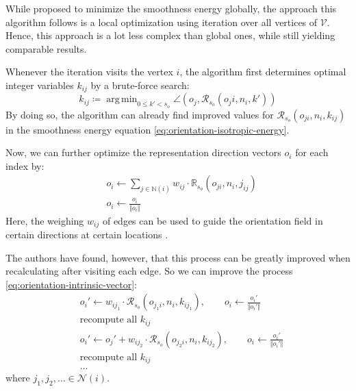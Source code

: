 \documentclass{ACGSeminar}
\DeclareMathOperator*{\argmin}{arg\,min}
\begin{document}
While \cite{bommes2009mixed} proposed to minimize the smoothness energy globally, the approach this algorithm follows is a local optimization using iteration over all vertices of $\mathcal{V}$. Hence, this approach is a lot less complex than global ones, while still yielding comparable results.

Whenever the iteration visits the vertex $i$, the algorithm first determines optimal integer variables $k_{ij}$ by a brute-force search:
\begin{equation}\label{eq:orientation-intrinsic-integer}
	k_{ij} \coloneqq \argmin_{0 \leq k' < s_o} \angle(o_j, \mathcal{R}_{s_o}(o_ji, n_i, k'))
\end{equation}
By doing so, the algorithm can already find improved values for $\mathcal{R}_{s_o}(o_{ji}, n_i, k_{ij})$ in the smoothness energy equation \eqref{eq:orientation-isotropic-energy}.

Now, we can further optimize the representation direction vectors $o_i$ for each index by:
\begin{equation}\label{eq:orientation-intrinsic-vector}
\begin{split}
	& o_i \leftarrow \sum_{j \in \mathbb{N}(i)} w_{ij} \cdot \mathbb{R}_{s_o}(o_{ji}, n_i, j_{ij})\\
	& o_i \leftarrow \frac{o_i}{\Vert o_i \Vert}
\end{split}
\end{equation}
Here, the weighing $w_{ij}$ of edges can be used to guide the orientation field in certain directions at certain locations \cite{jakob2015instant}.\bigskip

The authors have found, however, that this process can be greatly improved when recalculating after visiting each edge. So we can improve the process \eqref{eq:orientation-intrinsic-vector}:
\begin{equation}
\begin{split}
	& o_i' \leftarrow w_{ij_1} \cdot \mathcal{R}_{s_o}(o_{j_1i}, n_i, k_{ij_1}), \qquad o_i \leftarrow \frac{o_i'}{\Vert o_i' \Vert}\\
	& \textrm{recompute all } k_{ij}\\
	& o_i' \leftarrow o_j' + w_{ij_2} \cdot \mathcal{R}_{s_o}(o_{j_2i}, n_i, k_{ij_2}), \qquad o_i \leftarrow \frac{o_i'}{\Vert o_i' \Vert}\\
	& \textrm{recompute all } k_{ij}\\
	& \dots
\end{split}
\end{equation}
where $j_1, j_2, \dots \in \mathcal{N}(i)$.
\end{document}
